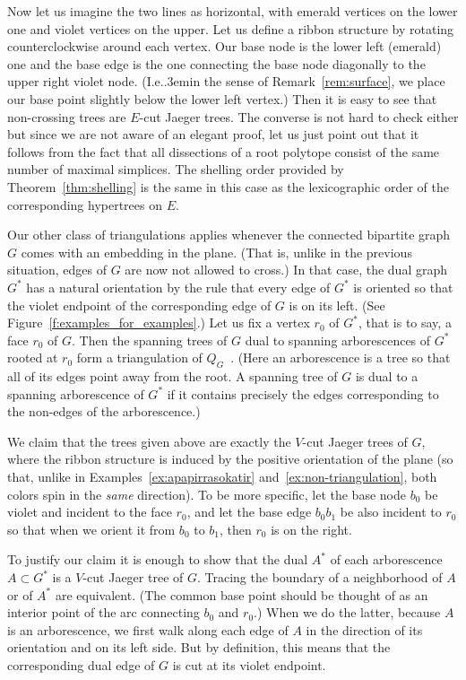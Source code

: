 \documentclass[10pt]{amsart}
\theoremstyle{definition}\newtheorem{defi}[theo]{Definition}
\theoremstyle{remark}\newtheorem{rema}[theo]{Remark}
\newcommand\Ie{I.e.\kern.3em}
\begin{document}
Now let us imagine the two lines as horizontal, with emerald vertices on the lower one and violet vertices on the upper. Let us define a ribbon structure by rotating counterclockwise around each vertex. Our base node is the lower left (emerald) one and the base edge is the one connecting the base node diagonally to the upper right violet node. (\Ie in the sense of Remark~\ref{rem:surface}, we place our base point slightly below the lower left vertex.) Then it is easy to see that non-crossing trees are $E$-cut Jaeger trees. The converse is not hard to check either but since we are not aware of an elegant proof, let us just point out that it follows from the fact that all dissections of a root polytope consist of the same number of maximal simplices. The shelling order provided by Theorem~\ref{thm:shelling} is the same in this case as the lexicographic order of the corresponding hypertrees on $E$.

Our other class of triangulations applies whenever the connected bipartite graph $G$ comes with an embedding in the plane. (That is, unlike in the previous situation, edges of $G$ are now not allowed to cross.) In that case, the dual graph $G^*$ has a natural orientation by the rule that every edge of $G^*$ is oriented so that the violet endpoint of the corresponding edge of $G$ is on its left. (See Figure~\ref{f:examples_for_examples}.) Let us fix a vertex $r_0$ of $G^*$, that is to say, a face $r_0$ of $G$. Then the spanning trees of $G$ dual to spanning arborescences of $G^*$ rooted at $r_0$ form a triangulation of $Q_G$~\cite{KM}. (Here an arborescence is a tree so that all of its edges point away from the root. A spanning tree of $G$ is dual to a spanning arborescence of $G^*$ if it contains precisely the edges corresponding to the non-edges of the arborescence.)

We claim that the trees given above are exactly the $V$-cut Jaeger trees of $G$, where the ribbon structure is induced by the positive orientation of the plane (so that, unlike in Examples~\ref{ex:apapirrasokatir} and~\ref{ex:non-triangulation}, both colors spin in the \emph{same} direction). To be more specific, let the base node $b_0$ be violet and incident to the face $r_0$, and let the base edge $b_0b_1$ be also incident to $r_0$ so that when we orient it from $b_0$ to $b_1$, then $r_0$ is on the right. 

To justify our claim it is enough to show that the dual $A^*$ of each arborescence $A\subset G^*$ is a $V$-cut Jaeger tree of $G$. Tracing the boundary of a neighborhood of $A$ or of $A^*$ are equivalent. (The common base point should be thought of as an interior point of the arc connecting $b_0$ and $r_0$.) When we do the latter, because $A$ is an arborescence, we first walk along each edge of $A$ in the direction of its orientation and on its left side. But by definition, this means that the corresponding dual edge of $G$ is cut at its violet endpoint.
\end{document}
